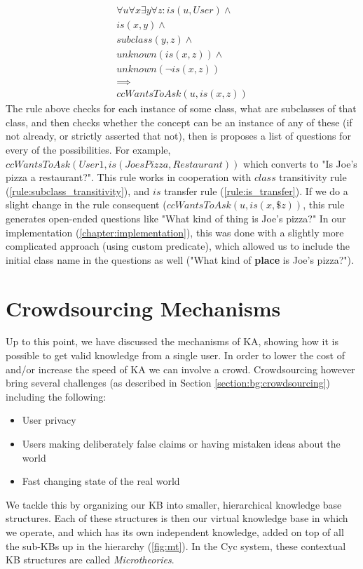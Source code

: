 \begin{equation}\label{rule:autoIs}
\begin{gathered}
 \forall u \forall x \exists y \forall z:
 is (u,User) \land \\
 is(x,y) \land \\
 subclass(y,z) \land \\
 unknown (is(x,z)) \land \\
 unknown(\lnot is(x,z)) \\
 \implies\\
 ccWantsToAsk(u,is(x,z))
\end{gathered}
\end{equation}
The rule above checks for each instance of some class, what are subclasses of 
that class, and then checks whether the concept can be an instance of any of 
these (if not already, or strictly asserted that not), then is proposes a
list of questions for every of the possibilities. For example,
$ccWantsToAsk(User1,is(JoesPizza,Restaurant))$ which converts to "Is Joe's 
pizza a restaurant?". This rule works in cooperation with $class$ transitivity
rule (\ref{rule:subclass_transitivity}), and $is$ transfer rule 
(\ref{rule:is_transfer}).
If we do a slight change in the rule consequent ($ccWantsToAsk(u,is(x,\$z))$,
this rule generates open-ended questions like "What kind of thing is Joe's
pizza?" In our implementation (\autoref{chapter:implementation}), this was
done with a slightly more complicated approach (using custom predicate), which
allowed us to include the initial class name in the questions as well 
("What kind of \textbf{place} is Joe's pizza?"). 

\section{Crowdsourcing Mechanisms}
\label{section:crowdsourcing}
Up to this point, we have discussed the mechanisms of KA, showing how it is 
possible to get valid knowledge from a single user. In order to lower the cost 
of and/or increase the speed of KA we can involve a crowd. Crowdsourcing 
however bring several challenges (as described in Section 
\autoref{section:bg:crowdsourcing}) including the following:
\begin{itemize}
\item User privacy
\item Users making deliberately false claims or having mistaken ideas about the 
world
\item Fast changing state of the real world
\end{itemize}
We tackle this by organizing our KB into smaller, hierarchical knowledge base 
structures. Each of these structures is then our virtual knowledge base in 
which we operate, and which has its own independent knowledge, added on top of 
all the sub-KBs up in the hierarchy (\autoref{fig:mt}). In the Cyc system, these
contextual KB structures are called \emph{Microtheories}\parencite{Kleer2013}.

